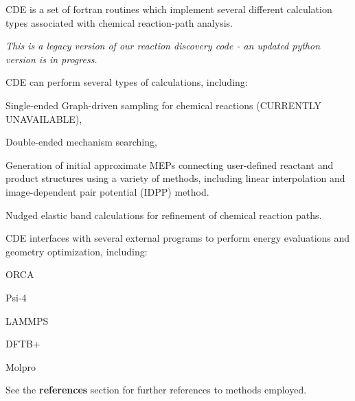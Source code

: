 C\+DE is a set of fortran routines which implement several different calculation types associated with chemical reaction-\/path analysis.

{\itshape This is a legacy version of our reaction discovery code -\/ an updated python version is in progress.}

C\+DE can perform several types of calculations, including\+:
\begin{DoxyItemize}
\item Single-\/ended Graph-\/driven sampling for chemical reactions (C\+U\+R\+R\+E\+N\+T\+LY U\+N\+A\+V\+A\+I\+L\+A\+B\+LE),
\item Double-\/ended mechanism searching,
\item Generation of initial approximate M\+E\+Ps connecting user-\/defined reactant and product structures using a variety of methods, including linear interpolation and image-\/dependent pair potential (I\+D\+PP) method.
\item Nudged elastic band calculations for refinement of chemical reaction paths.
\end{DoxyItemize}

C\+DE interfaces with several external programs to perform energy evaluations and geometry optimization, including\+:
\begin{DoxyItemize}
\item O\+R\+CA
\item Psi-\/4
\item L\+A\+M\+M\+PS
\item D\+F\+T\+B+
\item Molpro
\end{DoxyItemize}

See the {\bfseries{references}} section for further references to methods employed. 